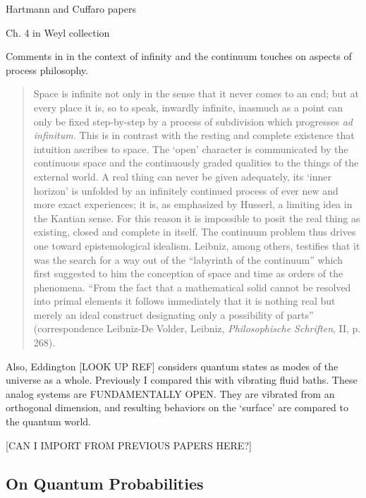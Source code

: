 Hartmann and Cuffaro papers

Ch. 4 in Weyl collection 

Comments in \cite{Weyl1949} in the context of infinity and the continuum touches on aspects of process philosophy.

\begin{quote}
    Space is infinite not only in the sense that it never comes to an end; but at every place it is, so to speak, inwardly infinite, inasmuch as a point can only be fixed step-by-step by a process of subdivision which progresses \emph{ad infinitum.}  This is in contrast with the resting and complete existence that intuition ascribes to space.  The `open' character is communicated by the continuous space and the continuously graded qualities to the things of the external world.  A real thing can never be given adequately, its `inner horizon' is unfolded by an infinitely continued process of ever new and more exact experiences; it is, as emphasized by Husserl, a limiting idea in the Kantian sense.  For this reason it is impossible to posit the real thing as existing, closed and complete in itself.  The continuum problem thus drives one toward epistemological idealism.  Leibniz, among others, testifies that it was the search for a way out of the ``labyrinth of the continuum'' which first suggested to him the conception of space and time as orders of the phenomena.  ``From the fact that a mathematical solid cannot be resolved into primal elements it follows immediately that it is nothing real but merely an ideal construct designating only a possibility of parts'' (correspondence Leibniz-De Volder, Leibniz, \emph{Philosophische Schriften}, II, p. 268).

    \citep[p. 41]{Weyl1949}
\end{quote}


Also, Eddington [LOOK UP REF] considers quantum states as modes of the universe as a whole.  Previously I compared this with vibrating fluid baths.  These analog systems are FUNDAMENTALLY OPEN.  They are vibrated from an orthogonal dimension, and resulting behaviors on the `surface' are compared to the quantum world.

[CAN I IMPORT FROM PREVIOUS PAPERS HERE?]



\subsection{On Quantum Probabilities}


